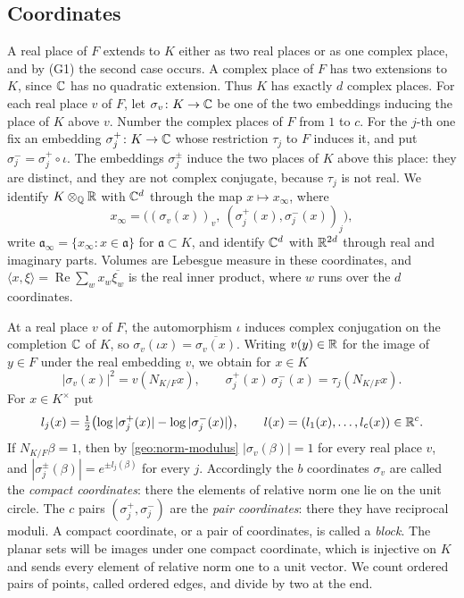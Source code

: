 \subsection{Coordinates}
A real place of $F$ extends to $K$ either as two real places or as one
complex place, and by (G1) the second case occurs. A complex place of
$F$ has two extensions to $K$, since $\mathbb C$ has no quadratic extension.
Thus $K$ has exactly $d$ complex places. For each real place $v$ of
$F$, let $\sigma_v\colon K\to\mathbb C$ be one of the two embeddings inducing
the place of $K$ above $v$. Number the complex places of $F$ from $1$
to $c$. For the $j$-th one fix an embedding $\sigma_j^+\colon K\to\mathbb C$
whose restriction $\tau_j$ to $F$ induces it, and put
$\sigma_j^-=\sigma_j^+\circ\iota$. The embeddings $\sigma_j^\pm$ induce
the two places of $K$ above this place: they are distinct, and they are
not complex conjugate, because $\tau_j$ is not real. We identify
$K\otimes_\mathbb Q\mathbb R$ with $\mathbb C^d$ through the map $x\mapsto x_\infty$, where
\[
 x_\infty=\bigl((\sigma_v(x))_v,\ (\sigma_j^+(x),\sigma_j^-(x))_{j}\bigr),
\]
write $\mathfrak a_\infty=\{x_\infty:x\in\mathfrak a\}$ for
$\mathfrak a\subset K$, and identify $\mathbb C^d$ with $\mathbb R^{2d}$ through real
and imaginary parts. Volumes are Lebesgue measure in these coordinates,
and $\langle x,\xi\rangle=\operatorname{Re}\sum_w x_w\overline{\xi_w}$
is the real inner product, where $w$ runs over the $d$ coordinates.

At a real place $v$ of $F$, the automorphism $\iota$ induces complex
conjugation on the completion $\mathbb C$ of $K$, so
$\sigma_v(\iota x)=\overline{\sigma_v(x)}$. Writing $v(y)\in\mathbb R$ for the
image of $y\in F$ under the real embedding $v$, we obtain for $x\in K$
\begin{equation}\label{geo:norm-modulus}
 |\sigma_v(x)|^2=v(N_{K/F}x),\qquad
 \sigma_j^+(x)\,\sigma_j^-(x)=\tau_j(N_{K/F}x).
\end{equation}
For $x\in K^\times$ put
\[
 l_j(x)=\tfrac12\bigl(\log|\sigma_j^+(x)|-\log|\sigma_j^-(x)|\bigr),
 \qquad l(x)=(l_1(x),\dots,l_c(x))\in\mathbb R^c .
\]
If $N_{K/F}\beta=1$, then by \eqref{geo:norm-modulus}
$|\sigma_v(\beta)|=1$ for every real place $v$, and
$|\sigma_j^\pm(\beta)|=e^{\pm l_j(\beta)}$ for every $j$. Accordingly the
$b$ coordinates $\sigma_v$ are called the \emph{compact coordinates}:
there the elements of relative norm one lie on the unit circle. The $c$
pairs $(\sigma_j^+,\sigma_j^-)$ are the \emph{pair coordinates}: there
they have reciprocal moduli. A compact coordinate, or a pair of
coordinates, is called a \emph{block}. The planar sets will be images
under one compact coordinate, which is injective on $K$ and sends every
element of relative norm one to a unit vector. We count ordered pairs of
points, called ordered edges, and divide by two at the end.

